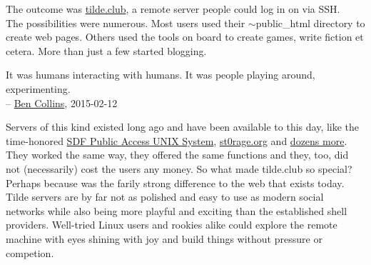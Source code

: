 The outcome was \href{http://www.tilde.club/}{tilde.club}, a remote server people could log in on via SSH.\\
The possibilities were numerous. Most users used their $\sim$\/public\_html  directory to create web pages. Others used the tools on board to create games, write fiction et cetera. More than just a few started blogging.

\begin{displayquote}
It was humans interacting with humans. It was people playing around, experimenting.\\
-- \href{http://www.thedailybeast.com/articles/2015/12/02/eating-bread-and-crying-on-the-floor-lonely-guy-finds-34k-new-year-s-dates.html}{Ben Collins}, 2015-02-12
\end{displayquote}

Servers of this kind existed long ago and have been available to this day, like the time-honored \href{http://sdf.org/}{SDF Public Access UNIX System}, \href{https://st0rage.org/}{st0rage.org} and \href{http://shells.red-pill.eu/}{dozens more}. They worked the same way, they offered the same functions and they, too, did not (necessarily) cost the users any money. So what made tilde.club so special?\\

Perhaps because was the farily strong difference to the web that exists today. Tilde servers are by far not as polished and easy to use as modern social networks while also being more playful and exciting than the established shell providers. Well-tried Linux users and rookies alike could explore the remote machine with eyes shining with joy and build things without pressure or competion.

